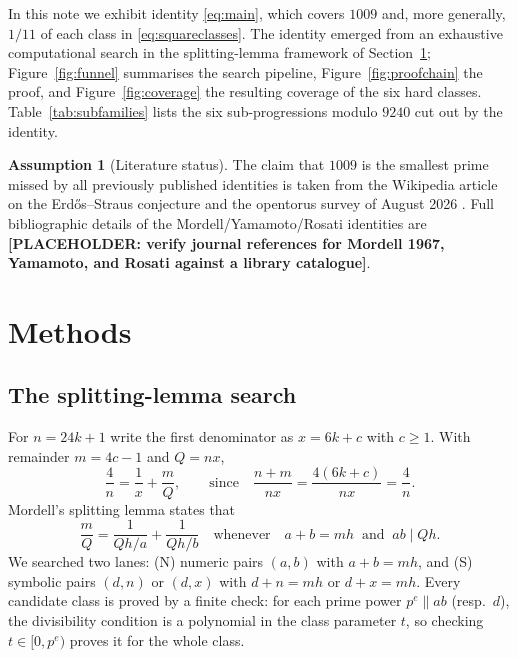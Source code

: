 \documentclass[11pt,a4paper]{article}
\theoremstyle{definition}
\newtheorem{assumption}{Assumption}
\begin{document}
In this note we exhibit identity \eqref{eq:main}, which covers $1009$ and,
more generally, $1/11$ of each class in \eqref{eq:squareclasses}. The
identity emerged from an exhaustive computational search in the
splitting-lemma framework of Section~\ref{sec:methods}; Figure~\ref{fig:funnel}
summarises the search pipeline, Figure~\ref{fig:proofchain} the proof, and
Figure~\ref{fig:coverage} the resulting coverage of the six hard classes.
Table~\ref{tab:subfamilies} lists the six sub-progressions modulo $9240$
cut out by the identity.

\begin{assumption}[Literature status]
  \label{ass:literature}
  The claim that $1009$ is the smallest prime missed by all previously
  published identities is taken from the Wikipedia article on the
  Erd\H{o}s--Straus conjecture \cite{wiki-es} and the opentorus survey of
  August 2026 \cite{opentorus2026}. Full bibliographic details of the
  Mordell/Yamamoto/Rosati identities are
  \textbf{[PLACEHOLDER: verify journal references for Mordell 1967,
  Yamamoto, and Rosati against a library catalogue]}.
\end{assumption}

\section{Methods}
\label{sec:methods}

\subsection{The splitting-lemma search}

For $n = 24k+1$ write the first denominator as $x = 6k+c$ with $c \geq 1$.
With remainder $m = 4c-1$ and $Q = nx$,
\begin{equation}
  \label{eq:firststep}
  \frac{4}{n} = \frac{1}{x} + \frac{m}{Q},
  \qquad\text{since}\quad
  \frac{n+m}{nx} = \frac{4(6k+c)}{nx} = \frac{4}{n}.
\end{equation}
Mordell's splitting lemma states that
\begin{equation}
  \label{eq:splitting}
  \frac{m}{Q} = \frac{1}{Qh/a} + \frac{1}{Qh/b}
  \quad\text{whenever}\quad a+b = mh \ \text{ and }\ ab \mid Qh.
\end{equation}
We searched two lanes: (N) numeric pairs $(a,b)$ with $a+b=mh$, and (S)
symbolic pairs $(d,n)$ or $(d,x)$ with $d+n=mh$ or $d+x=mh$. Every candidate
class is proved by a finite check: for each prime power $p^e \parallel ab$
(resp.\ $d$), the divisibility condition is a polynomial in the class
parameter $t$, so checking $t \in [0, p^e)$ proves it for the whole class.
\end{document}
